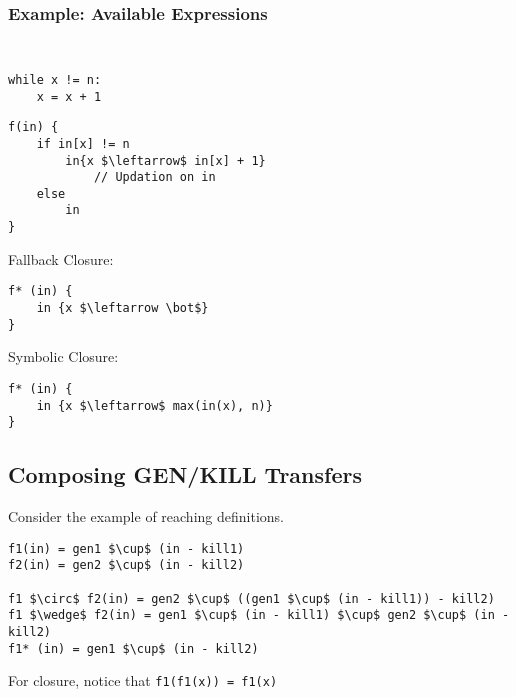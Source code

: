 \subsubsection{Example: Available Expressions}

\begin{minipage}{0.4\textwidth}
    \tt
    \captionsetup{type=figure}

    \begin{lstlisting}
while x != n:
    x = x + 1
    \end{lstlisting}
\end{minipage}
\hfill
\begin{minipage}{0.5\textwidth}
    \begin{lstlisting}
f(in) {
    if in[x] != n
        in{x $\leftarrow$ in[x] + 1} 
            // Updation on in
    else
        in
}
    \end{lstlisting}

    Fallback Closure:
    \begin{lstlisting}
f* (in) {
    in {x $\leftarrow \bot$}
}
    \end{lstlisting}

    Symbolic Closure:
    \begin{lstlisting}
f* (in) {
    in {x $\leftarrow$ max(in(x), n)}
}
    \end{lstlisting}
\end{minipage}

\subsection{Composing GEN/KILL Transfers}

Consider the example of reaching definitions.
\begin{lstlisting}
f1(in) = gen1 $\cup$ (in - kill1)
f2(in) = gen2 $\cup$ (in - kill2)

f1 $\circ$ f2(in) = gen2 $\cup$ ((gen1 $\cup$ (in - kill1)) - kill2)
f1 $\wedge$ f2(in) = gen1 $\cup$ (in - kill1) $\cup$ gen2 $\cup$ (in - kill2)
f1* (in) = gen1 $\cup$ (in - kill2)
\end{lstlisting}

For closure, notice that \texttt{f1(f1(x)) = f1(x)}
